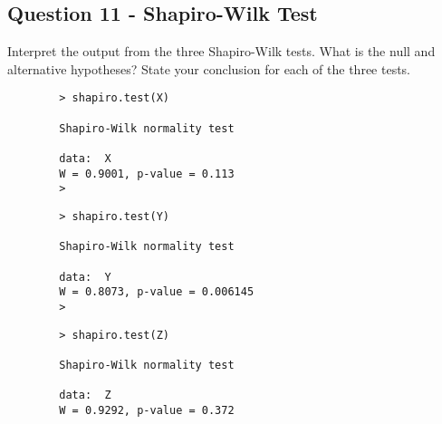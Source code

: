 \documentclass[]{report}
\begin{document}
	\subsection*{Question 11 - Shapiro-Wilk Test}
	Interpret the output from the three Shapiro-Wilk tests. What is the null and alternative hypotheses? State your conclusion for each of the three tests.
	\begin{framed}
		\begin{verbatim}
		> shapiro.test(X)
		
		Shapiro-Wilk normality test
		
		data:  X
		W = 0.9001, p-value = 0.113
		>
		\end{verbatim}
	\end{framed}
	\begin{framed}
		\begin{verbatim}
		> shapiro.test(Y)
		
		Shapiro-Wilk normality test
		
		data:  Y 
		W = 0.8073, p-value = 0.006145
		>
		\end{verbatim}
	\end{framed}
	\begin{framed}
		\begin{verbatim}
		> shapiro.test(Z)
		
		Shapiro-Wilk normality test
		
		data:  Z
		W = 0.9292, p-value = 0.372
		\end{verbatim}
	\end{framed}
\end{document}
